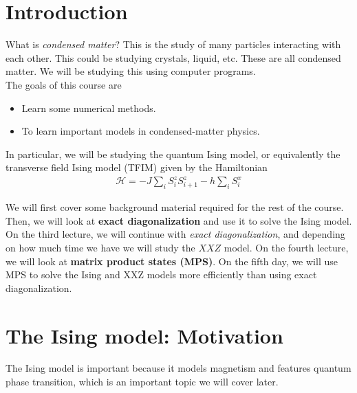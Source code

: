 \documentclass{book}
\theoremstyle{definition}
\newcommand{\had}{\mathcal{H}}
\begin{document}
\section{Introduction}

What is \textit{condensed matter}? This is the study of many particles interacting with each other. This could be studying crystals, liquid, etc. These are all condensed matter. We will be studying this using computer programs. \\

The goals of this course are
\begin{itemize}
	\item Learn some numerical methods.
	\item To learn important models in condensed-matter physics.  
\end{itemize}

In particular, we will be studying the quantum Ising model, or equivalently the transverse field Ising model (TFIM) given by the Hamiltonian
\begin{align}
\had = -J \sum_i S^z_i S^z_{i+1} - h \sum_i S^x_i
\end{align}

We will first cover some background material required for the rest of the course. Then, we will look at \textbf{exact diagonalization} and use it to solve the Ising model. On the third lecture, we will continue with \textit{exact diagonalization}, and depending on how much time we have we will study the $XXZ$ model. On the fourth lecture, we will look at \textbf{matrix product states (MPS)}. On the fifth day, we will use MPS to solve the Ising and XXZ models more efficiently than using exact diagonalization.


\newpage
   





\section{The Ising model: Motivation}

The Ising model is important because it models magnetism and features quantum phase transition, which is an important topic we will cover later.\\
\end{document}

